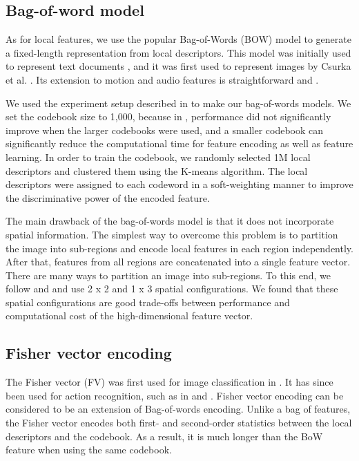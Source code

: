 \subsection{Bag-of-word model}
As for local features, we use the popular Bag-of-Words (BOW) model to generate a fixed-length representation from local descriptors. This model was initially used to represent text documents \cite{harris1954distributional}, and it was first used to represent images by Csurka et al. \cite{csurka2004visual}. Its extension to motion and audio features is straightforward \cite{sivic2009efficient} and \cite{jiang2010columbia}.

We used the experiment setup described in \cite{jiang2010representations} to make our bag-of-words models. We set the codebook size to 1,000, because in \cite{jiang2010representations}, performance did not significantly improve when the larger codebooks were used, and a smaller codebook can significantly reduce the computational time for feature encoding as well as feature learning. In order to train the codebook, we randomly selected 1M local descriptors and clustered them using the K-means algorithm. The local descriptors were assigned to each codeword in a soft-weighting manner \cite{jiang2007towards} to improve the discriminative power of the encoded feature.

The main drawback of the bag-of-words model is that it does not incorporate spatial information. The simplest way to overcome this problem is to partition the image into sub-regions and encode local features in each region independently. After that, features from all regions are concatenated into a single feature vector. There are many ways to partition an image into sub-regions. To this end, we follow \cite{jiang2010representations} and \cite{lazebnik2006beyond} and use 2 x 2 and 1 x 3 spatial configurations. We found that these spatial configurations are good trade-offs between performance and computational cost of the high-dimensional feature vector.

\subsection{Fisher vector encoding}
The Fisher vector (FV) was first used for image classification in \cite{jaakkola1999exploiting}. It has since been used for action recognition, such as in \cite{sun2013large} and \cite{wang2013action}. Fisher vector encoding can be considered to be an extension of Bag-of-words encoding. Unlike a bag of features, the Fisher vector encodes both first- and second-order statistics between the local descriptors and the codebook. As a result, it is much longer than the BoW feature when using the same codebook. 


